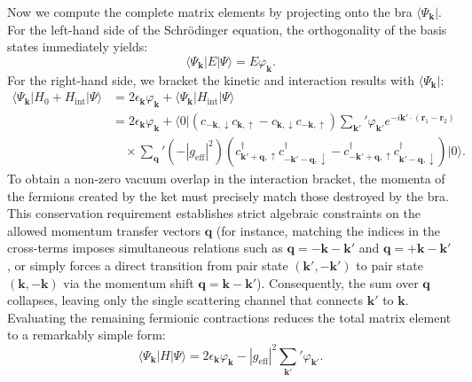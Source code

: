 Now we compute the complete matrix elements by projecting onto the bra \( \langle \Psi_{\mathbf{k}} | \). For the left-hand side of the Schrödinger equation, the orthogonality of the basis states immediately yields:
\[
    \langle \Psi_{\mathbf{k}} | E | \Psi \rangle = E \varphi_{\mathbf{k}}.
\]
For the right-hand side, we bracket the kinetic and interaction results with \( \langle \Psi_{\mathbf{k}} | \):
\[
    \begin{aligned}
        \langle \Psi_{\mathbf{k}} | H_0 + H_{\text{int}} | \Psi \rangle & = 2\epsilon_{\mathbf{k}} \varphi_{\mathbf{k}} + \langle \Psi_{\mathbf{k}} | H_{\text{int}} | \Psi \rangle                                                                                                                                                                              \\
                                                                        & = 2\epsilon_{\mathbf{k}} \varphi_{\mathbf{k}} + \langle 0 | \left( c_{-\mathbf{k}, \downarrow} c_{\mathbf{k}, \uparrow} - c_{\mathbf{k}, \downarrow} c_{-\mathbf{k}, \uparrow} \right) \sum_{\mathbf{k}'}' \varphi_{\mathbf{k}'} e^{-i\mathbf{k}' \cdot (\mathbf{r}_1 - \mathbf{r}_2)} \\
                                                                        & \quad \times \sum_{\mathbf{q}}' (-|g_{\text{eff}}|^2) \left( c_{\mathbf{k}' + \mathbf{q}, \uparrow}^\dagger c_{-\mathbf{k}' - \mathbf{q}, \downarrow}^\dagger - c_{-\mathbf{k}' + \mathbf{q}, \uparrow}^\dagger c_{\mathbf{k}' - \mathbf{q}, \downarrow}^\dagger \right) |0\rangle.
    \end{aligned}
\]
To obtain a non-zero vacuum overlap in the interaction bracket, the momenta of the fermions created by the ket must precisely match those destroyed by the bra. This conservation requirement establishes strict algebraic constraints on the allowed momentum transfer vectors \( \mathbf{q} \) (for instance, matching the indices in the cross-terms imposes simultaneous relations such as \( \mathbf{q} = -\mathbf{k} - \mathbf{k}' \) and \( \mathbf{q} = +\mathbf{k} - \mathbf{k}' \), or simply forces a direct transition from pair state \( (\mathbf{k}', -\mathbf{k}') \) to pair state \( (\mathbf{k}, -\mathbf{k}) \) via the momentum shift \( \mathbf{q} = \mathbf{k} - \mathbf{k}' \)). Consequently, the sum over \( \mathbf{q} \) collapses, leaving only the single scattering channel that connects \( \mathbf{k}' \) to \( \mathbf{k} \). Evaluating the remaining fermionic contractions reduces the total matrix element to a remarkably simple form:
\[
    \langle \Psi_{\mathbf{k}} | H | \Psi \rangle = 2\epsilon_{\mathbf{k}} \varphi_{\mathbf{k}} - |g_{\text{eff}}|^2 \sum_{\mathbf{k}'}' \varphi_{\mathbf{k}'}.
\]

